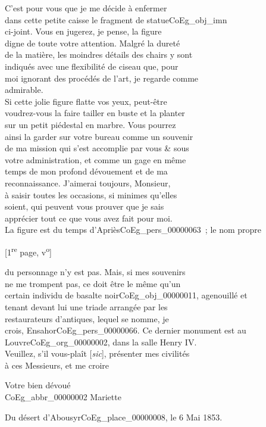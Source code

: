 \documentclass{book}
\begin{document}
C’est pour vous que je me décide à enfermer\\
dans cette petite caisse le fragment de statue\gls{CoEg_obj_imn}\\
ci-joint. Vous en jugerez, je pense, la figure\\
digne de toute votre attention. Malgré la dureté\\
de la matière, les moindres détails des chairs y sont\\
indiqués avec une flexibilité de ciseau que, pour\\
moi ignorant des procédés de l’art, je regarde comme\\
admirable.\\
\indent Si cette jolie figure flatte vos yeux, peut-être\\
voudrez-vous la faire tailler en buste et la planter\\
sur un petit piédestal en marbre. Vous pourrez\\
ainsi la garder sur votre bureau comme un souvenir\\
de ma mission qui s’est accomplie par vous \& sous\\
votre administration, et comme un gage en même\\
temps de mon profond dévouement et de ma\\
reconnaissance. J’aimerai toujours, Monsieur,\\
à saisir toutes les occasions, si minimes qu’elles\\
soient, qui peuvent vous prouver que je sais\\
apprécier tout ce que vous avez fait pour moi.\\
\indent La figure est du temps d’Apriès\gls{CoEg_pers_00000063}~; le nom propre
{\footnotesize \begin{center} {[1\textsuperscript{re} page, v\textsuperscript{o}]}\end{center}}
\noindent du personnage n’y est pas. Mais, si mes souvenirs\\
ne me trompent pas, ce doit être le même qu’un\\
certain individu de basalte noir\gls{CoEg_obj_00000011}, agenouillé et\\
tenant devant lui une triade arrangée par les\\
restaurateurs d’antiques, lequel se nomme, je\\
crois, Ensahor\gls{CoEg_pers_00000066}. Ce dernier monument est au\\
Louvre\gls{CoEg_org_00000002}, dans la salle Henry IV.\\
\indent Veuillez, s’il vous-plaît {[\textit{sic}]}, présenter mes civilités\\
à ces Messieurs, et me croire
\begin{center}\hspace{5cm} Votre bien dévoué\\
\hspace{5cm} \gls{CoEg_abbr_00000002} Mariette\end{center}
\indent Du désert d’Abousyr\gls{CoEg_place_00000008}, le 6 Mai 1853.
\end{document}
